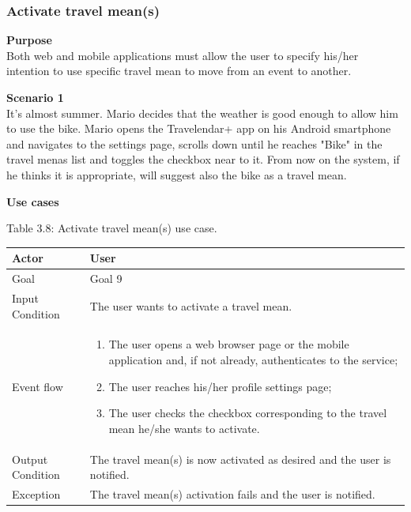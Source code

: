 \documentclass{article}
\begin{document}
	\subsubsection{Activate travel mean(s)}
	
	\bigskip
	\noindent
	\textbf{Purpose} \\
	Both web and mobile applications must allow the user to specify his/her intention to use specific travel mean to move from an event to another.
	
	\bigskip
	\noindent
	\textbf{Scenario 1} \\
	It's almost summer. Mario decides that the weather is good enough to allow him to use the bike. Mario opens the Travelendar+ app on his Android smartphone and navigates to the settings page, scrolls down until he reaches "Bike" in the travel menas list and toggles the checkbox near to it. From now on the system, if he thinks it is appropriate, will suggest also the bike as a travel mean.
	
	\bigskip
	\noindent
	\textbf{Use cases} \\
	
	\begin{center}
		Table 3.8: Activate travel mean(s) use case.
		
		\bigskip
    		\begin{tabular}{p{}|p{}}
   		 	\hline
    			Actor & User \\ \hline
    			Goal & Goal 9 \\ \hline
    			Input Condition & The user wants to activate a travel mean. \\ \hline
    			Event flow & 
			\begin{enumerate}
  				\item The user opens a web browser page or the mobile application and, if not already, authenticates to the service;
  				\item The user reaches his/her profile settings page;
  				\item The user checks the checkbox corresponding to the travel mean he/she wants to activate.
 			 \end{enumerate} \\ \hline
    			Output Condition & The travel mean(s) is now activated as desired and the user is notified. \\ \hline
    			Exception & The travel mean(s) activation fails and the user is notified. \\ \hline
    		\end{tabular}
	\end{center}
	
\end{document}
